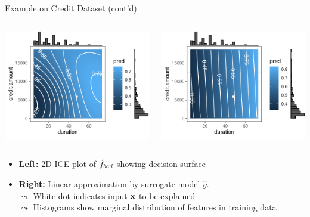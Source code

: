 \documentclass[10pt,compress,t,notes=noshow, xcolor=table]{beamer}
\newcommand{\gh}{\hat{g}}
\begin{document}
\begin{frame}{Example on Credit Dataset (cont'd)}
\begin{columns}[totalwidth=\textwidth]
  \begin{column}{0.47\textwidth}
    \centering
    \includegraphics[width=\linewidth]{figure/lime_credit_ice1.pdf}
  \end{column}
  \begin{column}{0.46\textwidth}
    \centering
    \includegraphics[width=\linewidth]{figure/lime_credit_ice2.pdf}
  \end{column}
\end{columns}

\begin{itemize}
    \item \textbf{Left:} 2D ICE plot of \( \hat{f}_{bad} \) showing decision surface
    \item \textbf{Right:} Linear approximation by surrogate model \( \gh \). \\
    $\leadsto$ White dot indicates input \( \mathbf{x} \) to be explained\\
    $\leadsto$ Histograms show marginal distribution of features in training data %
\end{itemize}

\end{frame}
\end{document}
